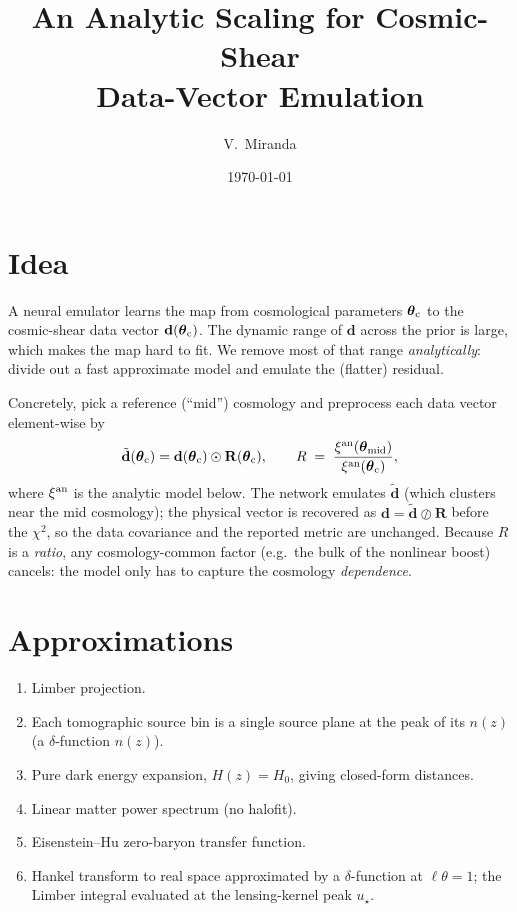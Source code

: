 \documentclass[11pt]{article}
\title{An Analytic Scaling for Cosmic-Shear\\
Data-Vector Emulation}
\author{V.\ Miranda}
\date{\today}
\begin{document}
\maketitle

\section{Idea}

A neural emulator learns the map from cosmological parameters
$\boldsymbol{\theta}_{\rm c}$ to the cosmic-shear data vector
$\mathbf d(\boldsymbol{\theta}_{\rm c})$. The dynamic range of
$\mathbf d$ across the prior is large, which makes the map hard
to fit. We remove most of that range \emph{analytically}: divide
out a fast approximate model and emulate the (flatter) residual.

Concretely, pick a reference (``mid'') cosmology and preprocess
each data vector element-wise by
\begin{equation}
  \tilde{\mathbf d}(\boldsymbol{\theta}_{\rm c})
  = \mathbf d(\boldsymbol{\theta}_{\rm c}) \odot
    \mathbf R(\boldsymbol{\theta}_{\rm c}),
  \qquad
  R \;=\; \frac{\xi^{\rm an}(\boldsymbol{\theta}_{\rm mid})}
               {\xi^{\rm an}(\boldsymbol{\theta}_{\rm c})},
  \label{eq:idea}
\end{equation}
where $\xi^{\rm an}$ is the analytic model below. The network
emulates $\tilde{\mathbf d}$ (which clusters near the mid
cosmology); the physical vector is recovered as
$\mathbf d=\tilde{\mathbf d}\oslash\mathbf R$ before the
$\chi^2$, so the data covariance and the reported metric are
unchanged. Because $R$ is a \emph{ratio}, any cosmology-common
factor (e.g.\ the bulk of the nonlinear boost) cancels: the
model only has to capture the cosmology \emph{dependence}.

\section{Approximations}

\begin{enumerate}[nosep]
  \item Limber projection.
  \item Each tomographic source bin is a single source plane at
        the peak of its $n(z)$ (a $\delta$-function $n(z)$).
  \item Pure dark energy expansion, $H(z)=H_0$, giving
        closed-form distances.
  \item Linear matter power spectrum (no halofit).
  \item Eisenstein--Hu zero-baryon transfer function.
  \item Hankel transform to real space approximated by a
        $\delta$-function at $\ell\theta=1$; the Limber integral
        evaluated at the lensing-kernel peak $u_\star$.
\end{enumerate}
\end{document}
